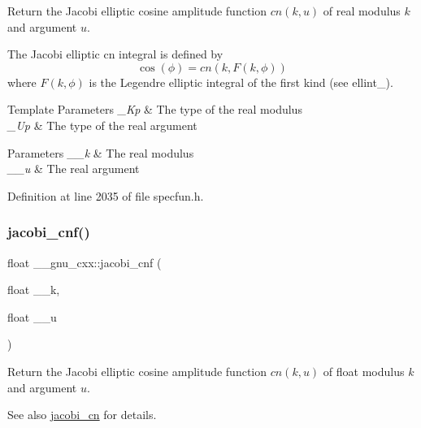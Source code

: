 Return the Jacobi elliptic cosine amplitude function $ cn(k,u) $ of real modulus $ k $ and argument $ u $.

The Jacobi elliptic {\ttfamily cn} integral is defined by \[ \cos(\phi) = cn(k, F(k,\phi)) \] where $ F(k,\phi) $ is the Legendre elliptic integral of the first kind (see ellint\+\_).


\begin{DoxyTemplParams}{Template Parameters}
{\em \+\_\+\+Kp} & The type of the real modulus \\
\hline
{\em \+\_\+\+Up} & The type of the real argument \\
\hline
\end{DoxyTemplParams}

\begin{DoxyParams}{Parameters}
{\em \+\_\+\+\_\+k} & The real modulus \\
\hline
{\em \+\_\+\+\_\+u} & The real argument \\
\hline
\end{DoxyParams}


Definition at line 2035 of file specfun.\+h.

\mbox{\label{group__gnu__math__spec__func_gadbd6320123f45ae10d539cf8df0373cd}} 
\subsubsection{\texorpdfstring{jacobi\+\_\+cnf()}{jacobi\_cnf()}}
{\footnotesize\ttfamily float \+\_\+\+\_\+gnu\+\_\+cxx\+::jacobi\+\_\+cnf (\begin{DoxyParamCaption}\item[{float}]{\+\_\+\+\_\+k,  }\item[{float}]{\+\_\+\+\_\+u }\end{DoxyParamCaption})\hspace{0.3cm}{\ttfamily [inline]}}

Return the Jacobi elliptic cosine amplitude function $ cn(k,u) $ of {\ttfamily float} modulus $ k $ and argument $ u $.

\begin{DoxySeeAlso}{See also}
\hyperlink{group__gnu__math__spec__func_ga2e1c43b232d378164bed1433041ca7dc}{jacobi\+\_\+cn} for details. 
\end{DoxySeeAlso}


